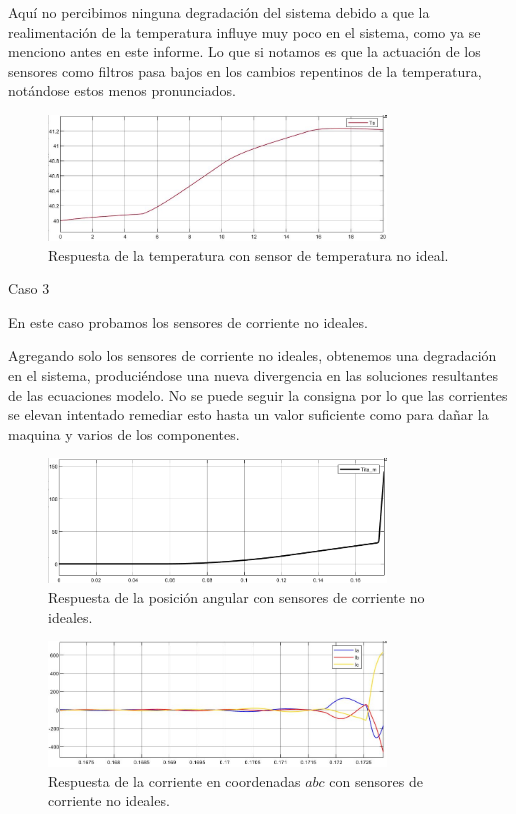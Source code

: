 \documentclass{article}
\begin{document}
Aquí no percibimos ninguna degradación del sistema debido a que la realimentación de la temperatura 
influye muy poco en el sistema, como ya se menciono antes en este informe. Lo que si notamos es que
la actuación de los sensores como filtros pasa bajos en los cambios repentinos de la temperatura, 
notándose estos menos pronunciados.
\begin{figure}[H]
    \centering
    \includegraphics[width=0.8\textwidth]{5.2.5.d.3.png}
    \caption{Respuesta de la temperatura con sensor de temperatura no ideal.}
\end{figure}

\bullet Caso 3

En este caso probamos los sensores de corriente no ideales.

Agregando solo los sensores de corriente no ideales, obtenemos una degradación en el sistema, 
produciéndose una nueva divergencia en las soluciones resultantes de las ecuaciones modelo. No 
se puede seguir la consigna por lo que las corrientes se elevan intentado remediar esto hasta 
un valor suficiente como para dañar la maquina y varios de los componentes.

\begin{figure}[H]
    \centering
    \includegraphics[width=0.8\textwidth]{5.2.5.d.4.png}
    \caption{Respuesta de la posición angular con sensores de corriente no ideales.}
\end{figure}

\begin{figure}[H]
    \centering
    \includegraphics[width=0.8\textwidth]{5.2.5.d.5.png}
    \caption{Respuesta de la corriente en coordenadas $abc$ con sensores de corriente no ideales.}
\end{figure}
\end{document}
